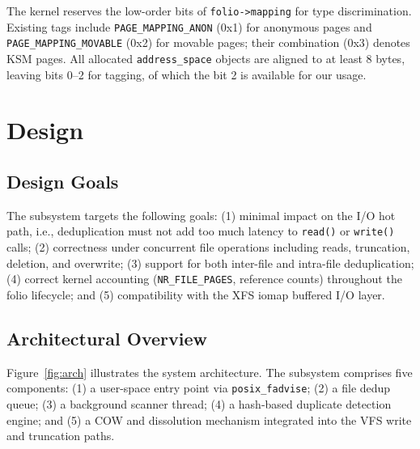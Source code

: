 \documentclass[conference]{IEEEtran}
\begin{document}
The kernel reserves the low-order bits of \texttt{folio->mapping} for type discrimination. Existing tags include \texttt{PAGE\_MAPPING\_ANON} (0x1) for anonymous pages and \texttt{PAGE\_MAPPING\_MOVABLE} (0x2) for movable pages; their combination (0x3) denotes KSM pages. All allocated \texttt{address\_space} objects are aligned to at least 8 bytes, leaving bits 0--2 for tagging, of which the bit 2 is available for our usage.

\section{Design}
\label{sec:design}

\subsection{Design Goals}

The subsystem targets the following goals: (1) minimal impact on the I/O hot path, i.e., deduplication must not add too much latency to \texttt{read()} or \texttt{write()} calls; (2) correctness under concurrent file operations including reads, truncation, deletion, and overwrite; (3) support for both inter-file and intra-file deduplication; (4) correct kernel accounting (\texttt{NR\_FILE\_PAGES}, reference counts) throughout the folio lifecycle; and (5) compatibility with the XFS iomap buffered I/O layer.

\subsection{Architectural Overview}

Figure~\ref{fig:arch} illustrates the system architecture. The subsystem comprises five components: (1) a user-space entry point via \texttt{posix\_fadvise}; (2) a file dedup queue; (3) a background scanner thread; (4) a hash-based duplicate detection engine; and (5) a COW and dissolution mechanism integrated into the VFS write and truncation paths.
\end{document}
